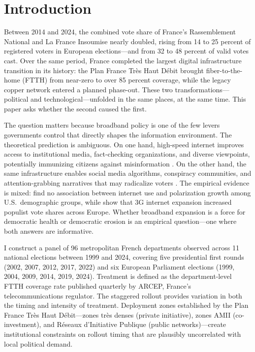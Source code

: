\documentclass[12pt]{article}
\begin{document}

\section{Introduction}

Between 2014 and 2024, the combined vote share of France's Rassemblement National and La France Insoumise nearly doubled, rising from 14 to 25 percent of registered voters in European elections---and from 32 to 48 percent of valid votes cast. Over the same period, France completed the largest digital infrastructure transition in its history: the Plan France Tr\`es Haut D\'ebit brought fiber-to-the-home (FTTH) from near-zero to over 85 percent coverage, while the legacy copper network entered a planned phase-out. These two transformations---political and technological---unfolded in the same places, at the same time. This paper asks whether the second caused the first.

The question matters because broadband policy is one of the few levers governments control that directly shapes the information environment. The theoretical prediction is ambiguous. On one hand, high-speed internet improves access to institutional media, fact-checking organizations, and diverse viewpoints, potentially immunizing citizens against misinformation \citep{gentzkow2011ideological}. On the other hand, the same infrastructure enables social media algorithms, conspiracy communities, and attention-grabbing narratives that may radicalize voters \citep{allcott2017social, lelkes2017hostile}. The empirical evidence is mixed: \citet{boxell2017greater} find no association between internet use and polarization growth among U.S.\ demographic groups, while \citet{guriev2021populism} show that 3G internet expansion increased populist vote shares across Europe. Whether broadband expansion is a force for democratic health or democratic erosion is an empirical question---one where both answers are informative.

I construct a panel of 96 metropolitan French departments observed across 11 national elections between 1999 and 2024, covering five presidential first rounds (2002, 2007, 2012, 2017, 2022) and six European Parliament elections (1999, 2004, 2009, 2014, 2019, 2024). Treatment is defined as the department-level FTTH coverage rate published quarterly by ARCEP, France's telecommunications regulator. The staggered rollout provides variation in both the timing and intensity of treatment. Deployment zones established by the Plan France Tr\`es Haut D\'ebit---zones tr\`es denses (private initiative), zones AMII (co-investment), and R\'eseaux d'Initiative Publique (public networks)---create institutional constraints on rollout timing that are plausibly uncorrelated with local political demand.
\end{document}
